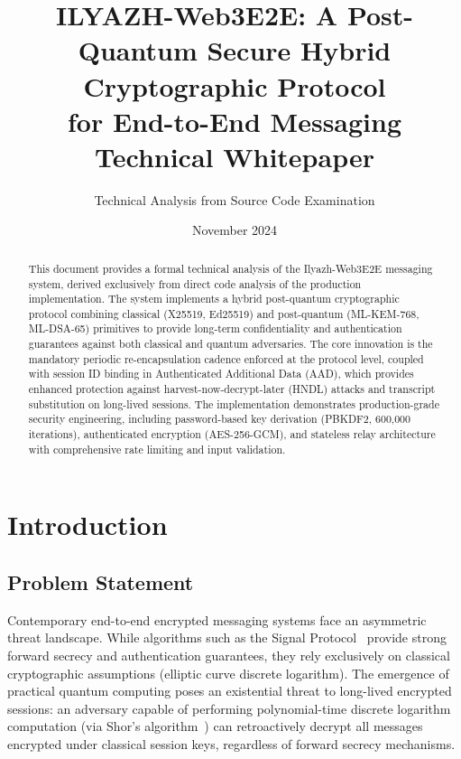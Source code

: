 \documentclass[11pt,a4paper,oneside]{article}
\title{\Large\bfseries ILYAZH-Web3E2E: A Post-Quantum Secure Hybrid Cryptographic Protocol\\for End-to-End Messaging\\[0.5em]\normalsize Technical Whitepaper}
\author{Technical Analysis from Source Code Examination}
\date{November 2024}
\begin{document}
\maketitle

\begin{abstract}
This document provides a formal technical analysis of the Ilyazh-Web3E2E messaging system, derived exclusively from direct code analysis of the production implementation. The system implements a hybrid post-quantum cryptographic protocol combining classical (X25519, Ed25519) and post-quantum (ML-KEM-768, ML-DSA-65) primitives to provide long-term confidentiality and authentication guarantees against both classical and quantum adversaries. The core innovation is the mandatory periodic re-encapsulation cadence enforced at the protocol level, coupled with session ID binding in Authenticated Additional Data (AAD), which provides enhanced protection against harvest-now-decrypt-later (HNDL) attacks and transcript substitution on long-lived sessions. The implementation demonstrates production-grade security engineering, including password-based key derivation (PBKDF2, 600,000 iterations), authenticated encryption (AES-256-GCM), and stateless relay architecture with comprehensive rate limiting and input validation.
\end{abstract}

\newpage
\tableofcontents
\newpage

\section{Introduction}

\subsection{Problem Statement}

Contemporary end-to-end encrypted messaging systems face an asymmetric threat landscape. While algorithms such as the Signal Protocol~\cite{signal2013} provide strong forward secrecy and authentication guarantees, they rely exclusively on classical cryptographic assumptions (elliptic curve discrete logarithm). The emergence of practical quantum computing poses an existential threat to long-lived encrypted sessions: an adversary capable of performing polynomial-time discrete logarithm computation (via Shor's algorithm~\cite{shor1994}) can retroactively decrypt all messages encrypted under classical session keys, regardless of forward secrecy mechanisms.
\end{document}
